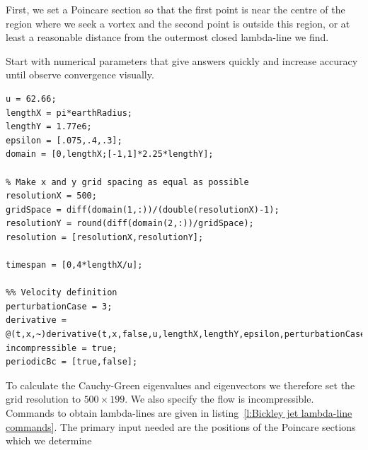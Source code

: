 \documentclass{article}
\begin{document}

First, we set a Poincare section so that the first point is near the centre of the region where we seek a vortex and the second point is outside this region, or at least a reasonable distance from the outermost closed lambda-line we find.


Start with numerical parameters that give answers quickly and increase accuracy until observe convergence visually.

\begin{lstlisting}[caption={Bickley jet input file: \texttt{demo/bickley\_jet/hyperbolic\_shear\_lcs.m}.},label=l:Bickley jet input]
%% Input parameters
u = 62.66;
lengthX = pi*earthRadius;
lengthY = 1.77e6;
epsilon = [.075,.4,.3];
domain = [0,lengthX;[-1,1]*2.25*lengthY];

% Make x and y grid spacing as equal as possible
resolutionX = 500;
gridSpace = diff(domain(1,:))/(double(resolutionX)-1);
resolutionY = round(diff(domain(2,:))/gridSpace);
resolution = [resolutionX,resolutionY];

timespan = [0,4*lengthX/u];

%% Velocity definition
perturbationCase = 3;
derivative = @(t,x,~)derivative(t,x,false,u,lengthX,lengthY,epsilon,perturbationCase);
incompressible = true;
periodicBc = [true,false];
\end{lstlisting}

To calculate the Cauchy-Green eigenvalues and eigenvectors we therefore set the grid resolution to $500 \times 199$. We also specify the flow is incompressible. Commands to obtain lambda-lines are given in listing~\ref{l:Bickley jet lambda-line commands}. The primary input needed are the positions of the Poincare sections which we determine
\end{document}
